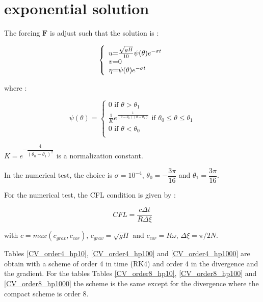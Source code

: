 \documentclass[10pt,a4paper]{amsart}
\begin{document}
\section{exponential solution}

The forcing $\mathbf{F}$ is adjust such that the solution is :

\begin{equation}
\left\lbrace
\begin{array}{r @{=} l}
u & \frac{\sqrt{gH}}{10} \psi ( \theta )  e^{-\sigma t} \\
v & 0 \\
\eta & \psi( \theta ) e^{-\sigma t}
\end{array}
\right.
\end{equation}

where :

\begin{equation*}
\psi ( \theta ) = 
\left\lbrace
\begin{array}{l}
0 \text{ if } \theta > \theta_1\\
\frac{1}{K}e^{\frac{1}{(\theta - \theta_0)(\theta-\theta_1)}} \text{ if } \theta_0 \leq \theta \leq \theta_1 \\
0 \text{ if } \theta < \theta_0\\
 
\end{array}
\right.
\label{galewski_fun}
\end{equation*}

$K = e^{-\dfrac{4}{(\theta_0 - \theta_1)^2}}$ is a normalization constant.

In the numerical test, the choice is $\sigma = 10^{-4}$, $\theta_0 = -\dfrac{3 \pi}{16}$ and $\theta_1 = \dfrac{3 \pi}{16}$.

For the numerical test, the CFL condition is given by :

\begin{equation}
CFL = \dfrac{c \Delta t}{R \Delta \xi}
\end{equation}

with $c = max(c_{grav}, c_{cor})$, $c_{grav} = \sqrt{gH}$ and $c_{cor} = R \omega$, $\Delta \xi = \pi / 2N$.

Tables \ref{CV_order4_hp10}, \ref{CV_order4_hp100} and \ref{CV_order4_hp1000} are obtain with a scheme of order 4 in time (RK4) and order 4 in the divergence and the gradient. For the tables Tables \ref{CV_order8_hp10}, \ref{CV_order8_hp100} and \ref{CV_order8_hp1000} the scheme is the same except for the divergence where the compact scheme is order 8.
\end{document}
